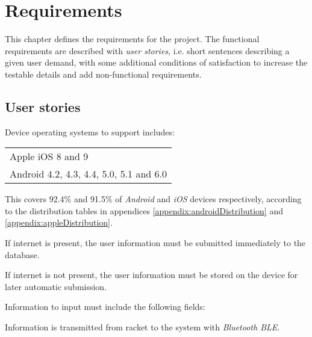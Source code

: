 \chapter{Requirements}
This chapter defines the requirements for the project. 
The functional requirements are described with \textit{user stories}, i.e. short sentences describing a given user demand, with some additional conditions of satisfaction to increase the testable details and add non-functional requirements.

\section*{User stories}


Device operating systems to support includes: \newline
\begin{tabularx}{\textwidth}{X}
    Apple iOS 8 and 9 \\
    Android 4.2, 4.3, 4.4, 5.0, 5.1 and 6.0
\end{tabularx}

This covers 92.4\% and 91.5\% of \textit{Android} and \textit{iOS} devices respectively, according to the distribution tables in appendices \ref{appendix:androidDistribution} and \ref{appendix:appleDistribution}.


If internet is present, the user information must be submitted immediately to the database.

If internet is not present, the user information must be stored on the device for later automatic submission.

Information to input must include the following fields:\newline
{}


Information is transmitted from racket to the system with \textit{Bluetooth BLE}. 


